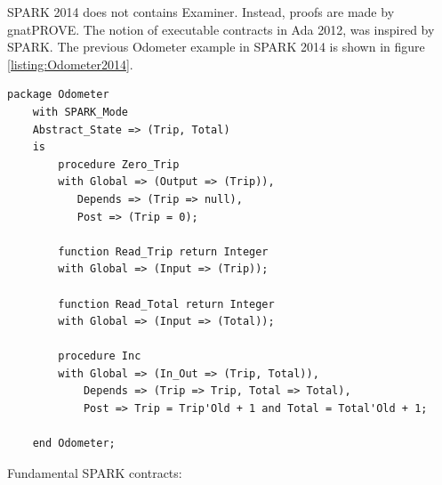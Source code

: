 SPARK 2014 does not contains Examiner. Instead, proofs are made by gnatPROVE.
The notion of executable contracts in Ada 2012, was inspired by SPARK. The previous Odometer example in SPARK 2014 is shown in figure \ref{listing:Odometer2014}.

\singlespacing
\begin{lstlisting}[language=ada2012, frame=single, gobble=0, caption={SPARK 2014 code: Odometer}, label={listing:Odometer2014}]
	package Odometer
	with SPARK_Mode
	Abstract_State => (Trip, Total)
	is
		procedure Zero_Trip
		with Global => (Output => (Trip)),
		   Depends => (Trip => null),
		   Post => (Trip = 0);

		function Read_Trip return Integer
		with Global => (Input => (Trip));

		function Read_Total return Integer
		with Global => (Input => (Total));

		procedure Inc	   
		with Global => (In_Out => (Trip, Total)),
			Depends => (Trip => Trip, Total => Total),
			Post => Trip = Trip'Old + 1 and Total = Total'Old + 1;

	end Odometer;
\end{lstlisting} 
\doublespacing

Fundamental SPARK contracts:

